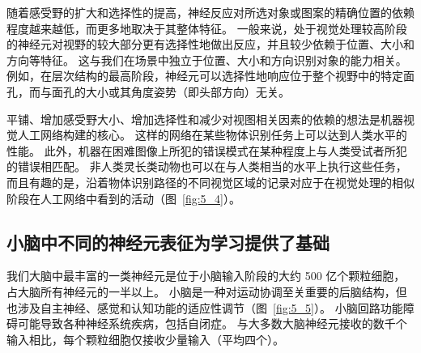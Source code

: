 随着感受野的扩大和选择性的提高，神经反应对所选对象或图案的精确位置的依赖程度越来越低，而更多地取决于其整体特征。
一般来说，处于视觉处理较高阶段的神经元对视野的较大部分更有选择性地做出反应，并且较少依赖于位置、大小和方向等特征。
这与我们在场景中独立于位置、大小和方向识别对象的能力相关。
例如，在层次结构的最高阶段，神经元可以选择性地响应位于整个视野中的特定面孔，而与面孔的大小或其角度姿势（即头部方向）无关。


平铺、增加感受野大小、增加选择性和减少对视图相关因素的依赖的想法是机器视觉人工网络构建的核心。
这样的网络在某些物体识别任务上可以达到人类水平的性能。 
此外，机器在困难图像上所犯的错误模式在某种程度上与人类受试者所犯的错误相匹配。
非人类灵长类动物也可以在与人类相当的水平上执行这些任务，而且有趣的是，沿着物体识别路径的不同视觉区域的记录对应于在视觉处理的相似阶段在人工网络中看到的活动（图~\ref{fig:5_4}）。



\subsection{小脑中不同的神经元表征为学习提供了基础}

我们大脑中最丰富的一类神经元是位于小脑输入阶段的大约 500 亿个颗粒细胞，占大脑所有神经元的一半以上。 
小脑是一种对运动协调至关重要的后脑结构，但也涉及自主神经、感觉和认知功能的适应性调节（图~\ref{fig:5_5}）。
小脑回路功能障碍可能导致各种神经系统疾病，包括自闭症。
与大多数大脑神经元接收的数千个输入相比，每个颗粒细胞仅接收少量输入（平均四个）。


